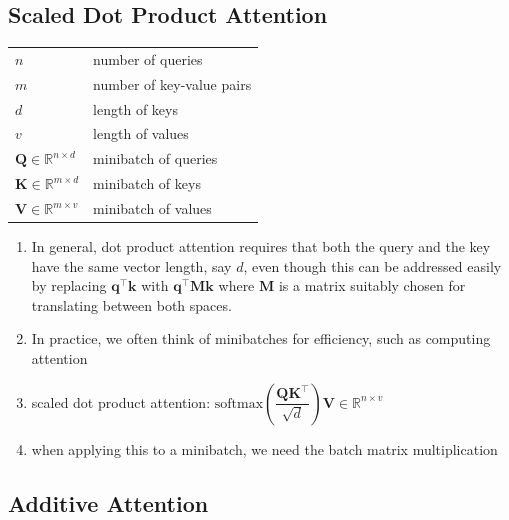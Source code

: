 \subsection{Scaled Dot Product Attention \cite{dnn-1}}

\begin{customTableWrapper}{1.5}
\begin{longtable}{l p{8cm}}
    $n$ & number of queries \\

    $m$ & number of key-value pairs \\

    $d$ & length of keys \\

    $v$ & length of values \\

    \hline

    $\mathbf Q\in\mathbb R^{n\times d}$ & minibatch of queries \\
    $\mathbf K\in\mathbb R^{m\times d}$ & minibatch of keys \\
    $\mathbf V\in\mathbb R^{m\times v}$ & minibatch of values \\
\end{longtable}
\end{customTableWrapper}

\begin{enumerate}
    \item In general, dot product attention requires that both the query and the key have the same vector length, say $d$, even though this can be addressed easily by replacing $\mathbf{q}^\top \mathbf{k}$ with $\mathbf{q}^\top \mathbf{M} \mathbf{k}$ where $\mathbf{M}$ is a matrix suitably chosen for translating between both spaces.

    \item In practice, we often think of minibatches for efficiency, such as computing attention

    \item scaled dot product attention: $\mathrm{softmax}\left(\dfrac{\mathbf Q \mathbf K^\top }{\sqrt{d}}\right) \mathbf V \in \mathbb{R}^{n\times v}$

    \item when applying this to a minibatch, we need the batch matrix multiplication
\end{enumerate}

\subsection{Additive Attention \cite{dnn-1}} \label{Additive Attention}

